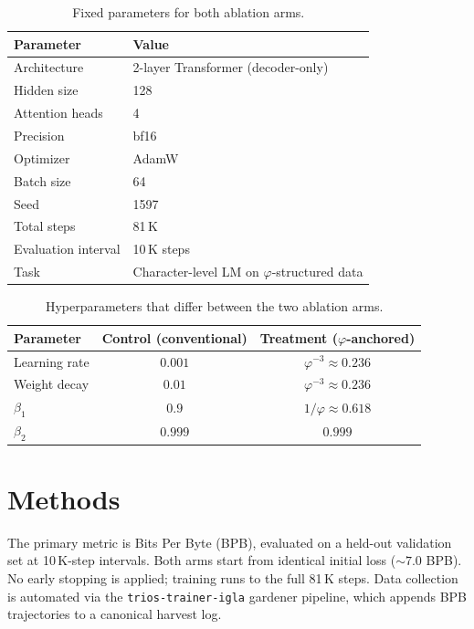 \documentclass[11pt,a4paper]{article}
\newcommand{\ph}{\varphi}
\begin{document}
\begin{table}[htbp]
\centering
\caption{Fixed parameters for both ablation arms.}
\label{tab:fixed}
\begin{tabular}{@{}ll@{}}
\toprule
Parameter & Value \\
\midrule
Architecture & 2-layer Transformer (decoder-only) \\
Hidden size & 128 \\
Attention heads & 4 \\
Precision & bf16 \\
Optimizer & AdamW \\
Batch size & 64 \\
Seed & 1597 \\
Total steps & 81\,K \\
Evaluation interval & 10\,K steps \\
Task & Character-level LM on $\varphi$-structured data \\
\bottomrule
\end{tabular}
\end{table}

\begin{table}[htbp]
\centering
\caption{Hyperparameters that differ between the two ablation arms.}
\label{tab:arms}
\begin{tabular}{@{}lcc@{}}
\toprule
Parameter & Control (conventional) & Treatment ($\varphi$-anchored) \\
\midrule
Learning rate & $0.001$ & $\ph^{-3}\approx 0.236$ \\
Weight decay & $0.01$ & $\ph^{-3}\approx 0.236$ \\
$\beta_{1}$ & $0.9$ & $1/\ph\approx 0.618$ \\
$\beta_{2}$ & $0.999$ & $0.999$ \\
\bottomrule
\end{tabular}
\end{table}

\section{Methods}

The primary metric is Bits Per Byte (BPB), evaluated on a held-out
validation set at 10\,K-step intervals.  Both arms start from identical
initial loss ($\sim 7.0$ BPB).  No early stopping is applied; training
runs to the full 81\,K steps.  Data collection is automated via the
\texttt{trios-trainer-igla} gardener pipeline, which appends BPB
trajectories to a canonical harvest log.
\end{document}
